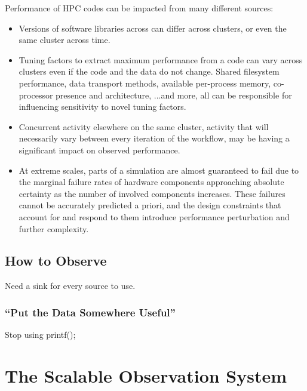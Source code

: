 Performance of HPC codes can be impacted from many different sources:
\begin{itemize}
    \item Versions of software libraries across can differ across
      clusters, or even the same cluster across time.
    \item Tuning factors to extract maximum performance from a code
      can vary across clusters even if the code and the data do not
      change. Shared filesystem performance, data transport methods,
      available per-process memory, co-processor presence and
      architecture, ...and more, all can be responsible for
      influencing sensitivity to novel tuning factors.
    \item Concurrent activity elsewhere on the same cluster, activity
      that will necessarily vary between every iteration of the
      workflow, may be having a significant impact on observed
      performance.
    \item At extreme scales, parts of a simulation are almost
      guaranteed to fail due to the marginal failure rates of hardware
      components approaching absolute certainty as the number of
      involved components increases. These failures cannot be
      accurately predicted a priori, and the design constraints that
      account for and respond to them introduce performance
      perturbation and further complexity.
\end{itemize}


\subsection{How to Observe}
Need a sink for every source to use.

\subsubsection{``Put the Data Somewhere Useful''}
Stop using printf();



\section{The Scalable Observation System}

